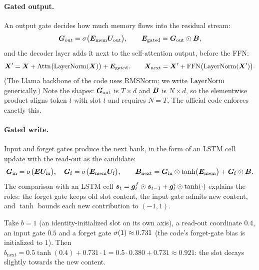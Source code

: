 \paragraph{Gated output.} An output gate decides how much memory flows into the residual stream:
\begin{equation}
  \bm{G}_{\mathrm{out}} = \sigma\bigl(\bm{E}_{\mathrm{mem}}\bm{U}_{\mathrm{out}}\bigr),\qquad
  \bm{E}_{\mathrm{gated}} = \bm{G}_{\mathrm{out}} \odot \bm{B} ,
  \label{eq:c10-lm2-out}
\end{equation}
and the decoder layer adds it next to the self-attention output, before the FFN:
\begin{equation}
  \bm{X}' = \bm{X} + \mathrm{Attn}\bigl(\operatorname{LayerNorm}(\bm{X})\bigr) + \bm{E}_{\mathrm{gated}}, \qquad
  \bm{X}_{\mathrm{next}} = \bm{X}' + \mathrm{FFN}\bigl(\operatorname{LayerNorm}(\bm{X}')\bigr).
  \label{eq:c10-lm2-block}
\end{equation}
(The Llama backbone of the code uses RMSNorm; we write $\operatorname{LayerNorm}$ generically.) Note the shapes:
$\bm{G}_{\mathrm{out}}$ is $T \times d$ and $\bm{B}$ is $N \times d$, so the elementwise product aligns
token $t$ with slot $t$ and requires $N = T$. The official code enforces exactly this.

\paragraph{Gated write.} Input and forget gates produce the next bank, in the form of an LSTM cell
update with the read-out as the candidate:
\begin{equation}
  \bm{G}_{\mathrm{in}} = \sigma\bigl(\bm{E}\bm{U}_{\mathrm{in}}\bigr),\quad
  \bm{G}_{\mathrm{f}} = \sigma\bigl(\bm{E}_{\mathrm{mem}}\bm{U}_{\mathrm{f}}\bigr),\qquad
  \bm{B}_{\mathrm{next}} = \bm{G}_{\mathrm{in}} \odot \tanh\bigl(\bm{E}_{\mathrm{mem}}\bigr)
  + \bm{G}_{\mathrm{f}} \odot \bm{B} .
  \label{eq:c10-lm2-write}
\end{equation}
The comparison with an LSTM cell $\bm{s}_t = \bm{g}^{f}_t \odot \bm{s}_{t-1} + \bm{g}^{i}_t \odot \tanh(\cdot)$
explains the roles: the forget gate keeps old slot content, the input gate admits new content, and
$\tanh$ bounds each new contribution to $(-1,1)$.

\begin{example}
Take $b = 1$ (an identity-initialized slot on its own axis), a read-out coordinate $0.4$, an input
gate $0.5$ and a forget gate $\sigma(1) \approx 0.731$ (the code's forget-gate bias is
initialized to $1$). Then $b_{\mathrm{next}} = 0.5\tanh(0.4) + 0.731 \cdot 1 = 0.5 \cdot 0.380 +
0.731 \approx 0.921$: the slot decays slightly towards the new content.
\end{example}


